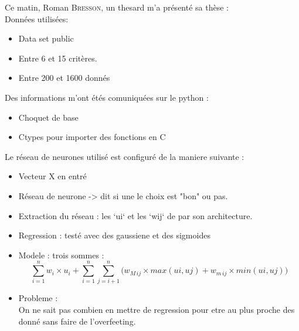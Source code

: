 ﻿Ce matin, Roman \textsc{Bresson}, un thesard m'a présenté sa thèse : \\


Données utilisées:
\begin{itemize}
    \item Data set public
    \item Entre 6 et 15 critères.
    \item Entre 200 et 1600 donnés
\end{itemize}


Des informations m'ont étés comuniquées sur le python :
\begin{itemize}
    \item Choquet de base
    \item Ctypes pour importer des fonctions en C
\end{itemize}


Le réseau de neurones utilisé est configuré de la maniere suivante :
\begin{itemize}
     \item Vecteur X en entré
     \item Réseau de neurone -> dit si une le choix est "bon" ou pas.
     \item Extraction du réseau : les `ui` et les `wij` de par son architecture.
     \item Regression : testé avec des gaussiene et des sigmoides
     \item Modele : trois sommes :
        \begin{equation}
            \sum_{i=1}^{n}
                w_i \times u_i +
            \sum_{i=1}^{n}\sum_{j=i+1}^{n}
            \Big(
                w_{M\,ij} \times max(ui,uj) + w_{m\,ij} \times min(ui,uj)
            \Big)
        \end{equation}
    \item Probleme : \\
        On ne sait pas combien en mettre de regression pour etre au plus proche des donné sans faire de l'overfeeting.
\end{itemize}
